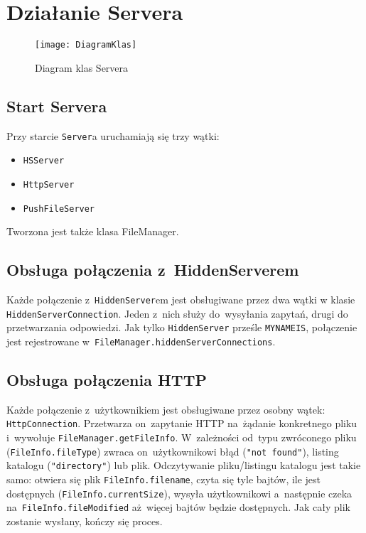 \documentclass[a4paper,notitlepage]{article}
\begin{document}
\pagestyle{fancy}
\tableofcontents
\section{Działanie Servera}
\begin{figure}
\texttt{[image: DiagramKlas]}
\caption{Diagram klas Servera}
\end{figure}
\subsection{Start Servera}
Przy starcie \verb!Server!a uruchamiają się trzy wątki: 
\begin{itemize}
\item \verb!HSServer!
\item \verb!HttpServer!
\item \verb!PushFileServer!
\end{itemize}
Tworzona jest także klasa FileManager.

\subsection{Obsługa połączenia z~HiddenServerem}
Każde połączenie z~\verb!HiddenServer!em jest obsługiwane przez 
dwa wątki w klasie \verb!HiddenServerConnection!. Jeden z~nich służy 
do~wysyłania zapytań, drugi do przetwarzania odpowiedzi.
Jak tylko \verb!HiddenServer! prześle \verb!MYNAMEIS!,
połączenie jest rejestrowane w~\verb!FileManager.hiddenServerConnections!.

\subsection{Obsługa połączenia HTTP}
Każde połączenie z~użytkownikiem jest obsługiwane przez osobny wątek: 
\verb!HttpConnection!. Przetwarza on~zapytanie HTTP na~żądanie konkretnego
pliku i~wywołuje \verb!FileManager.getFileInfo!. W~zależności od~typu zwróconego
pliku (\verb!FileInfo.fileType!) zwraca on~użytkownikowi błąd 
(\verb!"not found"!), listing katalogu (\verb!"directory"!) lub plik.
Odczytywanie pliku/listingu katalogu jest takie samo:
otwiera się plik \verb!FileInfo.filename!, czyta się tyle bajtów, ile jest
dostępnych (\verb!FileInfo.currentSize!), wysyła użytkownikowi a~następnie czeka
na~\verb!FileInfo.fileModified! aż~więcej bajtów będzie dostępnych. Jak cały 
plik zostanie wysłany, kończy się proces.
\end{document}
